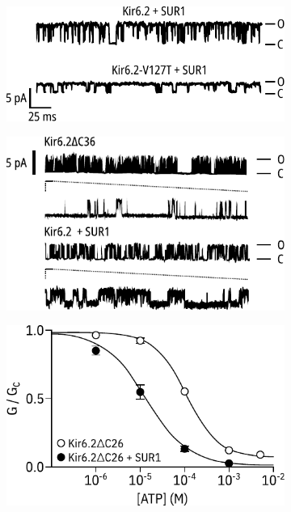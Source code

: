 \begin{figure}[h]
	\centering
	\begin{subfigure}[t]{0.45\textwidth}
		\caption{}\label{ch1fig:singles_ploop}
		\centering
		\includegraphics[width=\textwidth]{single_traces_ploop.pdf}
	\end{subfigure}
	\hfill
	\begin{subfigure}[t]{0.45\textwidth}
		\caption{}\label{ch1fig:singles_sur}
		\centering
		\includegraphics[width=\textwidth]{single_traces_sur.pdf}
	\end{subfigure}
	\vfill
	\begin{subfigure}[t]{0.45\textwidth}
		\caption{}\label{ch1fig:sur_shift}
		\centering
		\includegraphics[width=\textwidth]{tucker_sur_shift.pdf}

\end{subfigure}
\end{figure}
